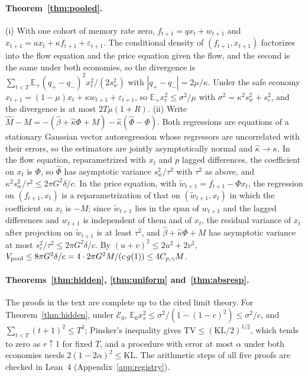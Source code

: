 \documentclass[12pt]{article}
\theoremstyle{definition}
\theoremstyle{remark}
\newcommand{\E}{\mathbb{E}}
\begin{document}
\paragraph{Theorem~\ref{thm:pooled}.} (i) With one cohort of memory rate zero, $f_{t+1}=qx_t+w_{t+1}$ and $x_{t+1}=ax_t+\kappa f_{t+1}+\varepsilon_{t+1}$. The conditional density of $(f_{t+1},x_{t+1})$ factorizes into the flow equation and the price equation given the flow, and the second is the same under both economies, so the divergence is $\sum_{t<T}\E_+(q_+-q_-)^2x_t^2/(2s_w^2)$ with $|q_+-q_-|=2\mu/\kappa$. Under the safe economy $x_{t+1}=(1-\mu)x_t+\kappa w_{t+1}+\varepsilon_{t+1}$, so $\E_+x_t^2\le\sigma^2/\mu$ with $\sigma^2=\kappa^2s_w^2+s_\varepsilon^2$, and the divergence is at most $2T\mu(1+R)$. (ii) Write $\hat M-M=-(\hat\beta+\hat\kappa\Phi+M)-\hat\kappa(\hat\Phi-\Phi)$. Both regressions are equations of a stationary Gaussian vector autoregression whose regressors are uncorrelated with their errors, so the estimators are jointly asymptotically normal and $\hat\kappa\to\kappa$. In the flow equation, reparametrized with $x_t$ and $p$ lagged differences, the coefficient on $x_t$ is $\Phi$, so $\hat\Phi$ has asymptotic variance $s_w^2/\tau^2$ with $\tau^2$ as above, and $\kappa^2s_w^2/\tau^2\le2\pi G^2\delta/c$. In the price equation, with $\tilde w_{t+1}=f_{t+1}-\Phi x_t$, the regression on $(f_{t+1},x_t)$ is a reparametrization of that on $(\tilde w_{t+1},x_t)$ in which the coefficient on $x_t$ is $-M$; since $\tilde w_{t+1}$ lies in the span of $w_{t+1}$ and the lagged differences and $w_{t+1}$ is independent of them and of $x_t$, the residual variance of $x_t$ after projection on $\tilde w_{t+1}$ is at least $\tau^2$, and $\hat\beta+\hat\kappa\Phi+M$ has asymptotic variance at most $s_\varepsilon^2/\tau^2\le2\pi G^2\delta/c$. By $(u+v)^2\le2u^2+2v^2$, $V_{\rm pool}\le8\pi G^2\delta/c=4\cdot2\pi G^2M/(c\,g(1))\le4C_{p,\gamma}M$.

\paragraph{Theorems~\ref{thm:hidden}, \ref{thm:uniform} and~\ref{thm:absresp}.} The proofs in the text are complete up to the cited limit theory. For Theorem~\ref{thm:hidden}, under $\mathcal E_0$, $\E_0x_s^2\le\sigma^2/(1-(1-c)^2)\le\sigma^2/c$, and $\sum_{t<T}(t+1)^2\le T^3$; Pinsker's inequality gives $\mathrm{TV}\le(\mathrm{KL}/2)^{1/2}$, which tends to zero as $r\uparrow1$ for fixed $T$, and a procedure with error at most $\alpha$ under both economies needs $2(1-2\alpha)^2\le\mathrm{KL}$. The arithmetic steps of all five proofs are checked in Lean~4 (Appendix~\ref{app:registry}).
\end{document}
